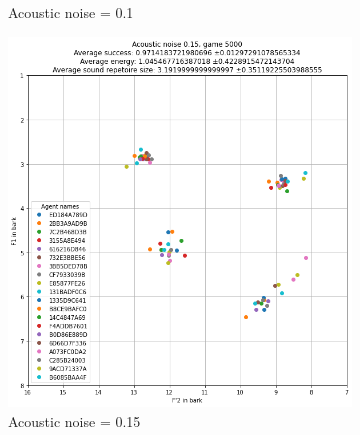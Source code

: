 \begin{figure}[ht]
\begin{subfigure}{.30\textwidth}
        \captionsetup{width=0.9\linewidth}
        \captionsetup{justification=centering}
        \caption{Acoustic noise = 0.1}
    \end{subfigure}
    \begin{subfigure}{.30\textwidth}
        \centering
        \includegraphics[width=\textwidth]{images/extra/bark_noise_4.png}
        \captionsetup{width=0.9\linewidth}
        \captionsetup{justification=centering}
        \caption{Acoustic noise = 0.15}
    \end{subfigure}
    \hspace{0.5cm}
    \begin{subfigure}{.30\textwidth}
        \centering

\end{subfigure}
\end{figure}
